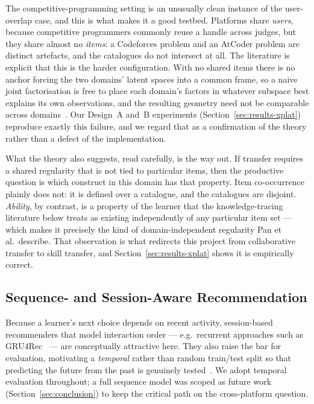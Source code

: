 \documentclass[12pt,a4paper]{article}
\begin{document}
The competitive-programming setting is an unusually clean instance of the user-overlap
case, and this is what makes it a good testbed. Platforms share \emph{users}, because
competitive programmers commonly reuse a handle across judges, but they share almost no
\emph{items}: a Codeforces problem and an AtCoder problem are distinct artefacts, and the
catalogues do not intersect at all. The literature is explicit that this is the harder
configuration. With no shared items there is no anchor forcing the two domains' latent
spaces into a common frame, so a naive joint factorisation is free to place each domain's
factors in whatever subspace best explains its own observations, and the resulting
geometry need not be comparable across domains~\cite{cantador2015,pan2010}. Our Design~A
and~B experiments (Section~\ref{sec:results-xplat}) reproduce exactly this failure, and
we regard that as a confirmation of the theory rather than a defect of the
implementation.

What the theory also suggests, read carefully, is the way out. If transfer requires a
shared regularity that is not tied to particular items, then the productive question is
which construct in this domain has that property. Item co-occurrence plainly does not:
it is defined over a catalogue, and the catalogues are disjoint. \emph{Ability}, by
contrast, is a property of the learner that the knowledge-tracing literature below treats
as existing independently of any particular item set --- which makes it precisely the kind
of domain-independent regularity Pan et al.\ describe. That observation is what redirects
this project from collaborative transfer to skill transfer, and
Section~\ref{sec:results-xplat} shows it is empirically correct.

\subsection{Sequence- and Session-Aware Recommendation}
Because a learner's next choice depends on recent activity, session-based recommenders
that model interaction order --- e.g.\ recurrent approaches such as
GRU4Rec~\cite{hidasi2016} --- are conceptually attractive here. They also raise the bar
for evaluation, motivating a \emph{temporal} rather than random train/test split so
that predicting the future from the past is genuinely tested~\cite{cremonesi2010}. We
adopt temporal evaluation throughout; a full sequence model was scoped as future work
(Section~\ref{sec:conclusion}) to keep the critical path on the cross-platform question.
\end{document}
